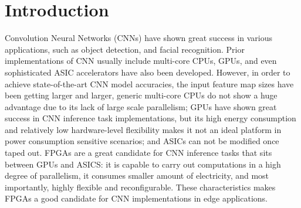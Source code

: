 \documentclass[sigconf, screen]{acmart}
\begin{document}



\newcommand{\RL}[1]{\textcolor{red}{[RL:] #1}}
\newcommand{\LJ}[1]{\textcolor{red}{[LJ:] #1}}
\newcommand{\CY}[1]{\textcolor{orange}{[CY:] #1}}

\maketitle

\section{Introduction}
Convolution Neural Networks (CNNs) have shown great success in various applications, such as object detection, and facial recognition\cite{objectrecognition, facenet}. Prior implementations of CNN usually include multi-core CPUs\cite{cpucnn}, GPUs\cite{alexnet}, and even sophisticated ASIC accelerators have also been developed\cite{eyeriss}. However, in order to achieve state-of-the-art CNN model accuracies, the input feature map sizes have been getting larger and larger, generic multi-core CPUs do not show a huge advantage due to its lack of large scale parallelism; GPUs have shown great success in CNN inference task implementations\cite{cpucnn}, but its high energy consumption and relatively low hardware-level flexibility makes it not an ideal platform in power consumption sensitive scenarios; and ASICs can not be modified once taped out. FPGAs are a great candidate for CNN inference tasks that sits between GPUs and ASICS: it is capable to carry out computations in a high degree of parallelism, it consumes smaller amount of electricity, and most importantly, highly flexible and reconfigurable. These characteristics makes FPGAs a good candidate for CNN implementations in edge applications. 
\end{document}
